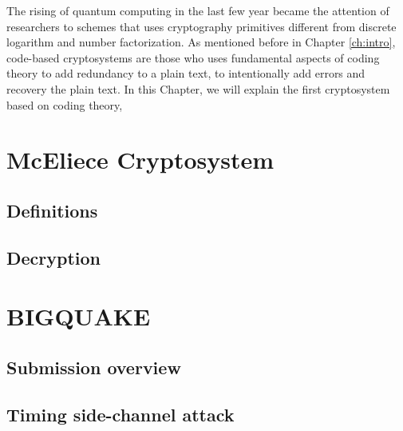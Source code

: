 The rising of quantum computing in the last few year became the attention of researchers to schemes that uses cryptography primitives different from discrete logarithm and number factorization. As mentioned before in Chapter \ref{ch:intro}, code-based cryptosystems are those who uses fundamental aspects of coding theory to add redundancy to a plain text, to intentionally add errors 
and recovery the plain text. In this Chapter, we will explain the first cryptosystem based on coding theory, 

\section{McEliece Cryptosystem}
\subsection{Definitions}
\subsection{Decryption}
\section{BIGQUAKE}
\subsection{Submission overview}
\subsection{Timing side-channel attack}
